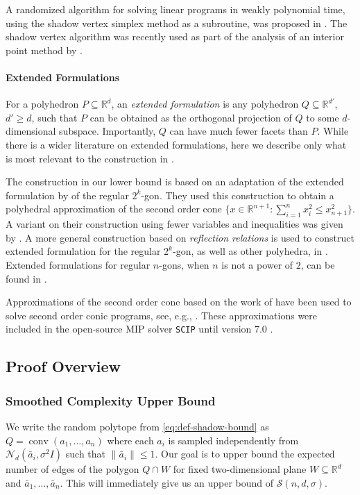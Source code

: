\documentclass{article}\usepackage[a4paper,margin=20mm]{geometry}
\newcommand{\R}{\mathbb R}
\newcommand{\conv}{\operatorname{conv}}
\renewcommand{\subset}{\subseteq}
\begin{document}
A randomized algorithm for solving linear programs in weakly polynomial time, using
the shadow vertex simplex method as a subroutine, was proposed in \cite{conf/stoc/KS06}.
The shadow vertex algorithm was recently used as part of the analysis of an interior point method
by \cite{adlnv}.

\paragraph{Extended Formulations}
For a polyhedron $P \subset \R^d$, an \emph{extended formulation}
is any polyhedron $Q \subset \R^{d'}$, $d' \geq d$,
such that $P$ can be obtained as the orthogonal projection of $Q$ to
some $d$-dimensional subspace.
Importantly, $Q$ can have much fewer facets than $P$.
While there is a wider literature on extended formulations,
here we describe only what is most relevant to the construction in .

The construction in our lower bound is based on an adaptation
of the extended formulation by \cite{BN01} of the regular $2^k$-gon.
They used this construction to obtain a polyhedral approximation
of the second order cone
$\{x \in \R^{n+1} : \sum_{i=1}^n x_i^2 \leq x_{n+1}^2\}$.
A variant on their construction using fewer variables and inequalities was
given by \cite{glineur}. A more general construction based on \emph{reflection relations}
is used to construct extended formulation for the regular $2^k$-gon, as well as
other polyhedra, in \cite{Kaibel2013}.
Extended formulations for regular $n$-gons, when $n$ is not a power of $2$,
can be found in \cite{VANDAELE2017217}.

Approximations of the second order cone based on the work of \cite{BN01,
glineur} have been used to solve second order conic programs, see, e.g.,
\cite{Brmann2015}. These approximations were included in the open-source MIP solver
\texttt{SCIP} until version 7.0 \cite{GamrathEtal2020OO}.


\subsection{Proof Overview}

\subsubsection{Smoothed Complexity Upper Bound}


We write the random polytope from \eqref{eq:def-shadow-bound} as $Q = \conv(a_1, \ldots, a_n)$ where each $a_i$ is sampled independently from $\mathcal{N}_d(\bar{a}_i, \sigma^2 I)$ such that $\|\bar{a}_i\| \leq 1$. 
Our goal is to upper bound the expected number of edges of the polygon $Q \cap W$ for
fixed two-dimensional plane $W \subset \R^d$ and $\bar{a}_1, \ldots, \bar{a}_n$. 
This will immediately give us an upper bound of $\mathcal{S}(n, d, \sigma)$.
\end{document}
